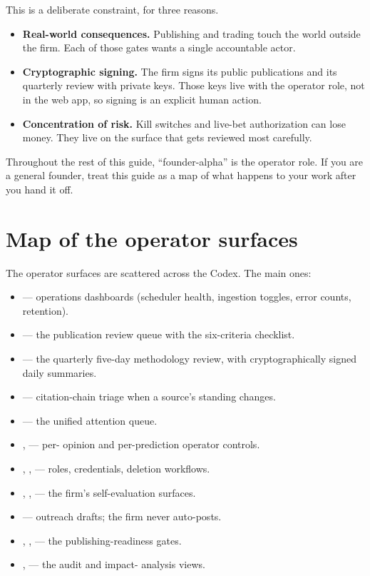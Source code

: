 \documentclass[11pt]{article}
\begin{document}
This is a deliberate constraint, for three reasons.

\begin{itemize}[leftmargin=*,itemsep=0.2em]
  \item \textbf{Real-world consequences.} Publishing and trading touch
        the world outside the firm. Each of those gates wants a single
        accountable actor.
  \item \textbf{Cryptographic signing.} The firm signs its public
        publications and its quarterly review with private keys. Those
        keys live with the operator role, not in the web app, so
        signing is an explicit human action.
  \item \textbf{Concentration of risk.} Kill switches and live-bet
        authorization can lose money. They live on the surface that
        gets reviewed most carefully.
\end{itemize}

Throughout the rest of this guide, ``founder-alpha'' is the operator
role. If you are a general founder, treat this guide as a map of what
happens to your work after you hand it off.

\section{Map of the operator surfaces}

The operator surfaces are scattered across the Codex. The main ones:

\begin{itemize}[leftmargin=*,itemsep=0.2em]
  \item {} --- operations dashboards (scheduler health,
        ingestion toggles, error counts, retention).
  \item {} --- the publication review queue with the
        six-criteria checklist.
  \item {} --- the quarterly five-day
        methodology review, with cryptographically signed daily
        summaries.
  \item {} --- citation-chain triage when a source's
        standing changes.
  \item {} --- the unified attention queue.
  \item {},  --- per-
        opinion and per-prediction operator controls.
  \item {}, ,  ---
        roles, credentials, deletion workflows.
  \item {}, ,  --- the
        firm's self-evaluation surfaces.
  \item {} --- outreach drafts; the firm never auto-posts.
  \item {}, ,  ---
        the publishing-readiness gates.
  \item {},  --- the audit and impact-
        analysis views.
\end{itemize}
\end{document}
